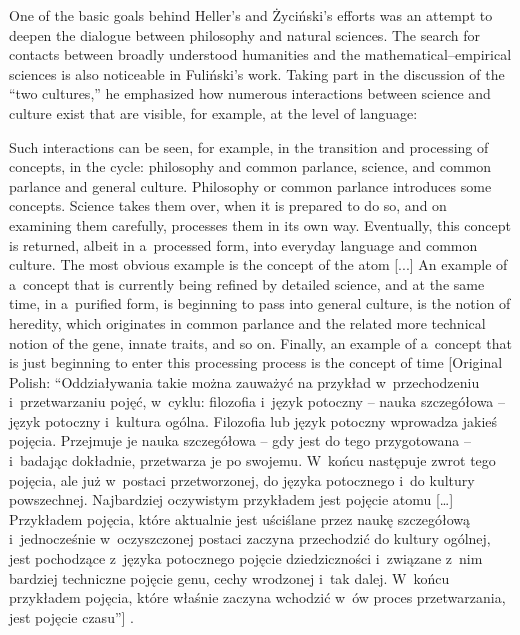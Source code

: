 One of the basic goals behind Heller's and Życiński's efforts was an attempt to deepen the dialogue between philosophy and natural sciences. The search for contacts between broadly understood humanities and the mathematical–empirical sciences is also noticeable in Fuliński's work. Taking part in the discussion of the ``two cultures,'' he emphasized how numerous interactions between science and culture exist that are visible, for example, at the level of language:



Such interactions can be seen, for example, in the transition and processing of concepts, in the cycle: philosophy and common parlance, science, and common parlance and general culture. Philosophy or common parlance introduces some concepts. Science takes them over, when it is prepared to do so, and on examining them carefully, processes them in its own way. Eventually, this concept is returned, albeit in a~processed form, into everyday language and common culture. The most obvious example is the concept of the atom [...] An example of a~concept that is currently being refined by detailed science, and at the same time, in a~purified form, is beginning to pass into general culture, is the notion of heredity, which originates in common parlance and the related more technical notion of the gene, innate traits, and so on. Finally, an example of a~concept that is just beginning to enter this processing process is the concept of time [Original Polish: ``Oddziaływania takie można zauważyć na przykład w~przechodzeniu i~przetwarzaniu pojęć, w~cyklu: filozofia i~język potoczny -- nauka szczegółowa -- język potoczny i~kultura ogólna. Filozofia lub język potoczny wprowadza jakieś pojęcia. Przejmuje je nauka szczegółowa -- gdy jest do tego przygotowana -- i~badając dokładnie, przetwarza je po swojemu. W~końcu następuje zwrot tego pojęcia, ale już w~postaci przetworzonej, do języka potocznego i~do kultury powszechnej. Najbardziej oczywistym przykładem jest pojęcie atomu […] Przykładem pojęcia, które aktualnie jest uściślane przez naukę szczegółową i~jednocześnie w~oczyszczonej postaci zaczyna przechodzić do kultury ogólnej, jest pochodzące z~języka potocznego pojęcie dziedziczności i~związane z~nim bardziej techniczne pojęcie genu, cechy wrodzonej i~tak dalej. W~końcu przykładem pojęcia, które właśnie zaczyna wchodzić w~ów proces przetwarzania, jest pojęcie czasu''] 
\parencite[][p.22]{janik_fizyka_1981}.%





